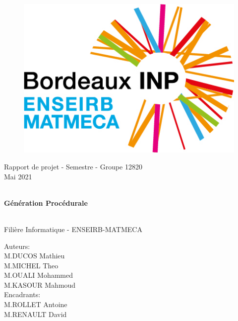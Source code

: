 \documentclass[a4paper,10pt]{article}
\begin{document}
\begin{figure}[h]
    \centering
    \includegraphics[scale=0.7]{enseirb.png}
\end{figure}
\begin{center}
\Large Rapport de projet - Semestre  - Groupe 12820 \\
\vspace{0.5cm}
Mai 2021
\vspace{2cm}
\begin{figure}[h]
\end{figure}\\
\vspace{1cm}
\textbf{\Huge Génération Procédurale}
\vspace{1cm}
\begin{figure}[h]
\end{figure}\\
\vspace{0.5cm}
Filière Informatique - ENSEIRB-MATMECA
\end{center}
\begin{flushleft}
Auteurs: \\
M.DUCOS Mathieu\\
M.MICHEL Theo\\
M.OUALI Mohammed \\
M.KASOUR Mahmoud\\
\vspace{0.5cm}
Encadrants:\\
M.ROLLET Antoine  \\
M.RENAULT David\\
\end{flushleft}
\end{document}
